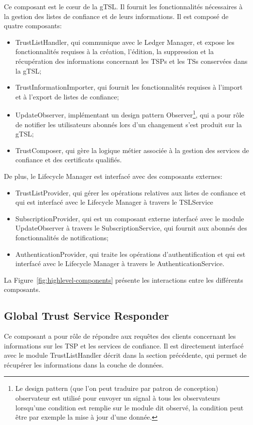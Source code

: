 \documentclass{tnreport}
\begin{document}
Ce composant est le cœur de la gTSL. Il fournit les fonctionnalités nécessaires à la gestion des listes de confiance et de leurs informations. Il est composé de quatre composants:
\begin{itemize}
	\item TrustListHandler, qui communique avec le Ledger Manager, et expose les fonctionnalités requises à la création, l'édition, la suppression et la récupération des informations concernant les TSPs et les TSs conservées dans la gTSL;
	\item TrustInformationImporter, qui fournit les fonctionnalités requises à l'import et à l'export de listes de confiance;
	\item UpdateObserver, implémentant un design pattern Observer\footnote{Le design pattern (que l'on peut traduire par patron de conception) observateur est utilisé pour envoyer un signal à tous les observateurs lorsqu'une condition est remplie sur le module dit observé, la condition peut être par exemple la mise à jour d'une donnée.}, qui a pour rôle de notifier les utilisateurs abonnés lors d'un changement s'est produit sur la gTSL;
	\item TrustComposer, qui gère la logique métier associée à la gestion des services de confiance et des certificats qualifiés.
\end{itemize}

De plus, le Lifecycle Manager est interfacé avec des composants externes:
\begin{itemize}
	\item TrustListProvider, qui gérer les opérations relatives aux listes de confiance et qui est interfacé avec le Lifecycle Manager à travers le TSLService
	\item SubscriptionProvider, qui est un composant externe interfacé avec le module UpdateObserver à travers le SubscriptionService, qui fournit aux abonnés des fonctionnalités de notifications;
	\item AuthenticationProvider, qui traite les opérations d'authentification et qui est interfacé avec le Lifecycle Manager à travers le AuthenticationService.
	\newline
\end{itemize}

La Figure~\ref{fig:highlevel-components} présente les interactions entre les différents composants.

\subsection{Global Trust Service Responder}
Ce composant a pour rôle de répondre aux requêtes des clients concernant les informations sur les TSP et les services de confiance. Il est directement interfacé avec le module TrustListHandler décrit dans la section précédente, qui permet de récupérer les informations dans la couche de données.
\end{document}
